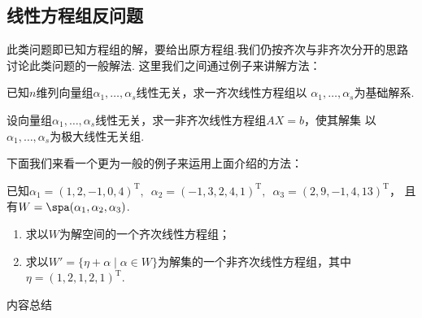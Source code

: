 \subsection{线性方程组反问题}

此类问题即已知方程组的解，要给出原方程组.我们仍按齐次与非齐次分开的思路讨论此类问题的一般解法.
这里我们之间通过例子来讲解方法：
\begin{example}
    已知$n$维列向量组$\alpha_1,\ldots,\alpha_s$线性无关，求一齐次线性方程组以
    $\alpha_1,\ldots,\alpha_s$为基础解系.
\end{example}
\begin{solution}

\end{solution}

\begin{example}
    设向量组$\alpha_1,\ldots,\alpha_s$线性无关，求一非齐次线性方程组$AX=b$，使其解集
    以$\alpha_1,\ldots,\alpha_s$为极大线性无关组.
\end{example}
\begin{solution}

\end{solution}

下面我们来看一个更为一般的例子来运用上面介绍的方法：
\begin{example}
    已知$\alpha_1=(1,2,-1,0,4)^\mathrm{T},\enspace\alpha_2=(-1,3,2,4,1)^\mathrm{T},\enspace\alpha_3=(2,9,-1,4,13)^\mathrm{T}$，
    且有$W=\spa(\alpha_1,\alpha_2,\alpha_3)$.
    \begin{enumerate}
        \item 求以$W$为解空间的一个齐次线性方程组；

        \item 求以$W'=\{\eta+\alpha \mid \alpha\in W\}$为解集的一个非齐次线性方程组，其中$\eta=(1,2,1,2,1)^\mathrm{T}$.
    \end{enumerate}
\end{example}
\begin{solution}

\end{solution}

\vspace{2ex}
\centerline{\heiti \Large 内容总结}

\vspace{2ex}

